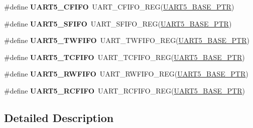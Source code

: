\begin{DoxyCompactItemize}
\item 
\hypertarget{group___u_a_r_t___register___accessor___macros_gaeefa6eb18025d241089f22cef12816a6}{}\#define {\bfseries U\+A\+R\+T5\+\_\+\+C\+F\+I\+F\+O}~U\+A\+R\+T\+\_\+\+C\+F\+I\+F\+O\+\_\+\+R\+E\+G(\hyperlink{group___u_a_r_t___peripheral_gace0110558cde93abab79b033e3caf755}{U\+A\+R\+T5\+\_\+\+B\+A\+S\+E\+\_\+\+P\+T\+R})\label{group___u_a_r_t___register___accessor___macros_gaeefa6eb18025d241089f22cef12816a6}

\item 
\hypertarget{group___u_a_r_t___register___accessor___macros_gad150f9bd18b6bfad66091d2c30877b3c}{}\#define {\bfseries U\+A\+R\+T5\+\_\+\+S\+F\+I\+F\+O}~U\+A\+R\+T\+\_\+\+S\+F\+I\+F\+O\+\_\+\+R\+E\+G(\hyperlink{group___u_a_r_t___peripheral_gace0110558cde93abab79b033e3caf755}{U\+A\+R\+T5\+\_\+\+B\+A\+S\+E\+\_\+\+P\+T\+R})\label{group___u_a_r_t___register___accessor___macros_gad150f9bd18b6bfad66091d2c30877b3c}

\item 
\hypertarget{group___u_a_r_t___register___accessor___macros_ga13f363bb4b0df38eea17350b01c9701a}{}\#define {\bfseries U\+A\+R\+T5\+\_\+\+T\+W\+F\+I\+F\+O}~U\+A\+R\+T\+\_\+\+T\+W\+F\+I\+F\+O\+\_\+\+R\+E\+G(\hyperlink{group___u_a_r_t___peripheral_gace0110558cde93abab79b033e3caf755}{U\+A\+R\+T5\+\_\+\+B\+A\+S\+E\+\_\+\+P\+T\+R})\label{group___u_a_r_t___register___accessor___macros_ga13f363bb4b0df38eea17350b01c9701a}

\item 
\hypertarget{group___u_a_r_t___register___accessor___macros_ga79218a8604525028728879cb322eb0f9}{}\#define {\bfseries U\+A\+R\+T5\+\_\+\+T\+C\+F\+I\+F\+O}~U\+A\+R\+T\+\_\+\+T\+C\+F\+I\+F\+O\+\_\+\+R\+E\+G(\hyperlink{group___u_a_r_t___peripheral_gace0110558cde93abab79b033e3caf755}{U\+A\+R\+T5\+\_\+\+B\+A\+S\+E\+\_\+\+P\+T\+R})\label{group___u_a_r_t___register___accessor___macros_ga79218a8604525028728879cb322eb0f9}

\item 
\hypertarget{group___u_a_r_t___register___accessor___macros_ga766ae030b47dba2e59e05f311eb7b5fc}{}\#define {\bfseries U\+A\+R\+T5\+\_\+\+R\+W\+F\+I\+F\+O}~U\+A\+R\+T\+\_\+\+R\+W\+F\+I\+F\+O\+\_\+\+R\+E\+G(\hyperlink{group___u_a_r_t___peripheral_gace0110558cde93abab79b033e3caf755}{U\+A\+R\+T5\+\_\+\+B\+A\+S\+E\+\_\+\+P\+T\+R})\label{group___u_a_r_t___register___accessor___macros_ga766ae030b47dba2e59e05f311eb7b5fc}

\item 
\hypertarget{group___u_a_r_t___register___accessor___macros_gab185e827477a31eb3381683fbf1bd3ab}{}\#define {\bfseries U\+A\+R\+T5\+\_\+\+R\+C\+F\+I\+F\+O}~U\+A\+R\+T\+\_\+\+R\+C\+F\+I\+F\+O\+\_\+\+R\+E\+G(\hyperlink{group___u_a_r_t___peripheral_gace0110558cde93abab79b033e3caf755}{U\+A\+R\+T5\+\_\+\+B\+A\+S\+E\+\_\+\+P\+T\+R})\label{group___u_a_r_t___register___accessor___macros_gab185e827477a31eb3381683fbf1bd3ab}

\end{DoxyCompactItemize}


\subsection{Detailed Description}
